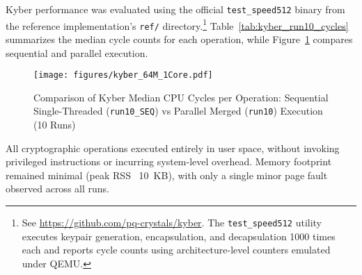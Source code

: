 

Kyber performance was evaluated using the official \texttt{test\_speed512} binary from the reference implementation's \texttt{ref/} directory.\footnote{See \url{https://github.com/pq-crystals/kyber}. The \texttt{test\_speed512} utility executes keypair generation, encapsulation, and decapsulation 1000 times each and reports cycle counts using architecture-level counters emulated under QEMU.} Table~\ref{tab:kyber_run10_cycles} summarizes the median cycle counts for each operation, while Figure~\ref{fig:kyber_native_cycles} compares sequential and parallel execution.


\begin{figure}[htbp]
    \centering
    \texttt{[image: figures/kyber\_64M\_1Core.pdf]}
    \caption{Comparison of Kyber Median CPU Cycles per Operation: Sequential Single-Threaded (\texttt{run10\_SEQ}) vs Parallel Merged (\texttt{run10}) Execution (10 Runs)}
    \label{fig:kyber_native_cycles}
\end{figure}
All cryptographic operations executed entirely in user space, without invoking privileged instructions or incurring system-level overhead. Memory footprint remained minimal (peak RSS ~10~KB), with only a single minor page fault observed across all runs.

